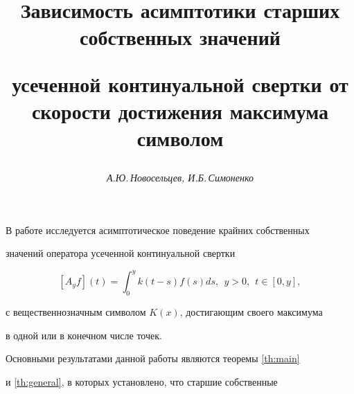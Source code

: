 






\author{\it А.Ю.\,Новосельцев, И.Б.\,Симоненко}




\title{Зависимость асимптотики старших собственных значений


усеченной континуальной свертки от скорости достижения максимума символом}





\date{}




\pagestyle{plain} %







\maketitle


\label{begin}





\setcounter{section}{0}





В работе исследуется асимптотическое поведение крайних собственных 


значений оператора усеченной континуальной свертки


\begin{equation} \label{operatorAy}


[A_{y} f](t)=\int_{0}^{y}k(t-s)f(s)ds,\ \ y>0,\ \ t\in[0,y],


\end{equation}


с вещественнозначным символом $K(x)$, достигающим своего максимума 


в одной или в конечном числе точек.





Основными результатами данной работы являются теоремы \ref{th:main}


и \ref{th:general}, в которых установлено, что старшие собственные 


